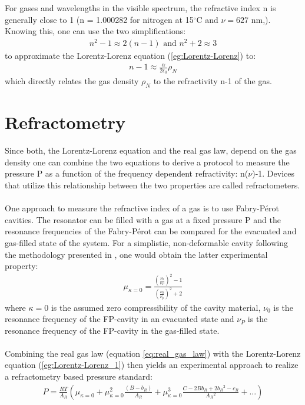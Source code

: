 \noindent
For gases and wavelengths in the visible spectrum, the refractive index n is generally close to 1 (n = 1.000282 for nitrogen at 15$^{\circ}$C and $\nu= 627$ nm,\cite{Peck-1966}). Knowing this, one can use the two simplifications:
\begin{align}
	n^2-1 \approx  2(n-1) \text{ and } n^2+2 \approx 3
	\label{eg:Lorentz-Lorenz_simplification}
\end{align}
to approximate the Lorentz-Lorenz equation (\ref{eg:Lorentz-Lorenz}) to:
\begin{align}
	n-1 \approx \frac{\alpha}{2\epsilon_0}\rho_N
	\label{eg:Lorentz-Lorenz_approximated}
\end{align}
which directly relates the gas density $\rho_N$ to the refractivity n-1 of the gas.
\section{Refractometry}
Since both, the Lorentz-Lorenz equation and the real gas law, depend on the gas density one can combine the two equations to derive a protocol to measure the pressure P as a function of the frequency dependent refractivity: n($\nu$)-1. Devices that utilize this relationship between the two properties are called refractometers. \\\\
\noindent
One approach to measure the refractive index of a gas is to use Fabry-Pérot cavities. The resonator can be filled with a gas at a fixed pressure P and the resonance frequencies of the Fabry-Pérot can be compared for the evacuated and gas-filled state of the system. For a simplistic, non-deformable cavity following the methodology presented in \cite{Jousten-2017}, one would obtain the latter experimental property:
\begin{align}
	\mu_{\kappa=0}=\frac{(\frac{\nu_0}{\nu_P})^2-1}{(\frac{\nu_0}{\nu_p})^2+2}
	\label{eg:refractrometry_measurement_prperty}
\end{align}
where $\kappa=0$ is the assumed zero compressibility of the cavity material, $\nu_0$ is the resonance frequency of the FP-cavity in an evacuated state and $\nu_P$ is the resonance frequency of the FP-cavity in the gas-filled state.\\\\
\noindent
Combining the real gas law (equation \ref{eq:real_gas_law}) with the Lorentz-Lorenz equation (\ref{eg:Lorentz-Lorenz_1}) then yields an experimental approach to realize a refractometry based pressure standard:
\begin{align}
	P=\frac{RT}{A_R}\left(\mu_{\kappa=0}+\mu_{\kappa=0}^2\frac{(B-b_R)}{A_R}+\mu_{\kappa=0}^3\frac{C-2Bb_R+2b{_R}^2-c_R}{A{_R}^2}+...\right)
	\label{eg:experimental_formular_refractometry}
\end{align}
